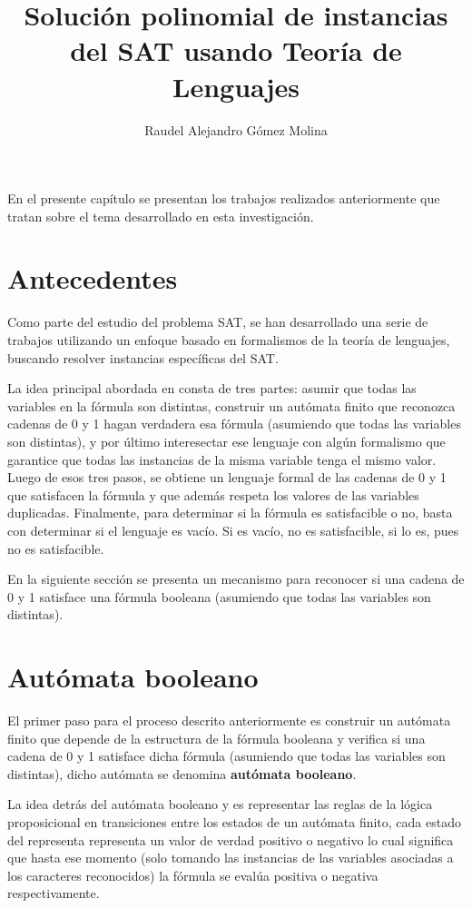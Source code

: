 \documentclass[12pt]{article}
\title{Solución polinomial de instancias del SAT usando Teoría de Lenguajes}
\author{Raudel Alejandro Gómez Molina}
\begin{document}
\maketitle

En el presente capítulo se presentan los trabajos realizados anteriormente que tratan sobre el tema desarrollado en esta investigación.

\section{Antecedentes}

Como parte del estudio del problema SAT, se han desarrollado una serie de trabajos utilizando un enfoque
basado en formalismos de la teoría de lenguajes, buscando resolver instancias específicas del SAT.

La idea principal abordada en \cite{aCFSAT} consta de tres partes: 
asumir que todas las variables en la fórmula son distintas, construir un autómata finito que reconozca cadenas de 0 y 1 hagan 
verdadera esa fórmula (asumiendo que todas las variables son distintas), y por último interesectar ese lenguaje con algún formalismo 
que garantice que todas las instancias de la misma variable tenga el mismo valor. Luego de esos tres pasos, se obtiene un lenguaje 
formal de las cadenas de 0 y 1 que satisfacen la fórmula y que además respeta los valores de las variables duplicadas. 
Finalmente, para determinar si la fórmula es satisfacible o no, basta con determinar si el lenguaje es vacío. Si es vacío, no 
es satisfacible, si lo es, pues no es satisfacible.

En la siguiente sección se presenta un mecanismo para reconocer si una cadena de 0 y 1 satisface una fórmula booleana
(asumiendo que todas las variables son distintas).

\section{Autómata booleano}

El primer paso para el proceso descrito anteriormente es construir un autómata finito que depende de la estructura de la fórmula booleana
y verifica si una cadena de 0 y 1 satisface dicha fórmula (asumiendo que todas las variables son distintas), dicho autómata se denomina
\textbf{autómata booleano}.

La idea detrás del autómata booleano y es representar las reglas de la lógica proposicional en transiciones entre los estados de un autómata finito,
cada estado del representa representa un valor de verdad positivo o negativo lo cual significa que hasta ese momento (solo tomando las instancias de 
las variables asociadas a los caracteres reconocidos) la fórmula se evalúa positiva o negativa respectivamente.   
\end{document}

